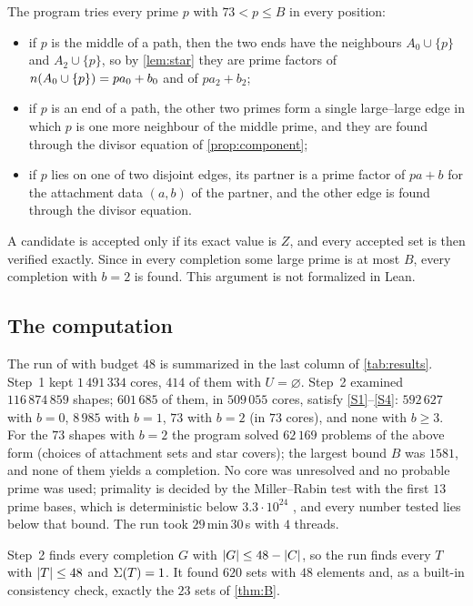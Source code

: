 \documentclass[11pt]{article}
\begin{document}
The program tries every prime $p$ with $73<p\le B$ in every position:
\begin{itemize}
\item if $p$ is the middle of a path, then the two ends have the neighbours $A_0\cup\{p\}$ and $A_2\cup\{p\}$, so by \cref{lem:star} they are prime factors of $n(A_0\cup\{p\})=pa_0+b_0$ and of $pa_2+b_2$;
\item if $p$ is an end of a path, the other two primes form a single large--large edge in which $p$ is one more neighbour of the middle prime, and they are found through the divisor equation of \cref{prop:component};
\item if $p$ lies on one of two disjoint edges, its partner is a prime factor of $pa+b$ for the attachment data $(a,b)$ of the partner, and the other edge is found through the divisor equation.
\end{itemize}
A candidate is accepted only if its exact value is $Z$, and every accepted set is then verified exactly. Since in every completion some large prime is at most $B$, every completion with $b=2$ is found.
This argument is not formalized in Lean.

\subsection{The computation}

The run of  with budget $48$ is summarized in the last column of \cref{tab:results}.
Step~1 kept $1\,491\,334$ cores, $414$ of them with $U=\varnothing$.
Step~2 examined $116\,874\,859$ shapes; $601\,685$ of them, in $509\,055$ cores, satisfy \ref{S1}--\ref{S4}: $592\,627$ with $b=0$, $8\,985$ with $b=1$, $73$ with $b=2$ (in $73$ cores), and none with $b\ge3$.
For the $73$ shapes with $b=2$ the program solved $62\,169$ problems of the above form (choices of attachment sets and star covers); the largest bound $B$ was $1581$, and none of them yields a completion.
No core was unresolved and no probable prime was used; primality is decided by the Miller--Rabin test with the first $13$ prime bases, which is deterministic below $3.3\cdot10^{24}$ \cite{SorensonWebster2017}, and every number tested lies below that bound.
The run took $29$\,min\,$30$\,s with $4$ threads.

Step~2 finds every completion $G$ with $\lvert G\rvert\le48-\lvert C\rvert$, so the run finds every $T$ with $\lvert T\rvert\le48$ and $\Sigma(T)=1$. It found $620$ sets with $48$ elements and, as a built-in consistency check, exactly the $23$ sets of \cref{thm:B}.
\end{document}
